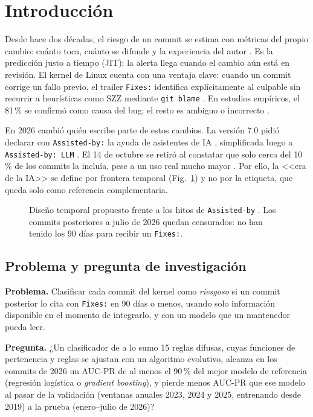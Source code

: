 \section{Introducción}

Desde hace dos décadas, el riesgo de un commit se estima con métricas del propio cambio: cuánto toca, cuánto se difunde y la experiencia del autor \cite{Mockus2000,Kamei2013}. Es la predicción justo a tiempo (JIT): la alerta llega cuando el cambio aún está en revisión. El kernel de Linux cuenta con una ventaja clave: cuando un commit corrige un fallo previo, el trailer \texttt{Fixes:} identifica explícitamente al culpable sin recurrir a heurísticas como SZZ mediante \texttt{git blame} \cite{Sliwerski2005}. En estudios empíricos, el 81\,\% se confirmó como causa del bug; el resto es ambiguo o incorrecto \cite{Lyu2024}.

En 2026 cambió quién escribe parte de estos cambios. La versión 7.0 pidió declarar con \texttt{Assisted-by:} la ayuda de asistentes de IA \cite{KernelAdd}, simplificada luego a \texttt{Assisted-by: LLM} \cite{KernelSimpl}. El 14 de octubre se retiró al constatar que solo cerca del 10\,\% de los commits la incluía, pese a un uso real mucho mayor \cite{KernelRemove}. Por ello, la <<era de la IA>> se define por frontera temporal (Fig.~\ref{fig:tiempo}) y no por la etiqueta, que queda solo como referencia complementaria.

\begin{figure}[!t]
\centering

\caption{Diseño temporal propuesto frente a los hitos de \texttt{Assisted-by} \cite{KernelAdd,KernelSimpl,KernelRemove}. Los commits posteriores a julio de 2026 quedan censurados: no han tenido los 90 días para recibir un \texttt{Fixes:}.}
\label{fig:tiempo}
\end{figure}

\subsection{Problema y pregunta de investigación}

\textbf{Problema.} Clasificar cada commit del kernel como \emph{riesgoso} si un commit posterior lo cita con \texttt{Fixes:} en 90 días o menos, usando solo información disponible en el momento de integrarlo, y con un modelo que un mantenedor pueda leer.

\textbf{Pregunta.} ¿Un clasificador de a lo sumo 15 reglas difusas, cuyas funciones de pertenencia y reglas se ajustan con un algoritmo evolutivo, alcanza en los commits de 2026 un AUC-PR de al menos el 90\,\% del mejor modelo de referencia (regresión logística o \emph{gradient boosting}), y pierde menos AUC-PR que ese modelo al pasar de la validación (ventanas anuales 2023, 2024 y 2025, entrenando desde 2019) a la prueba (enero--julio de 2026)?

